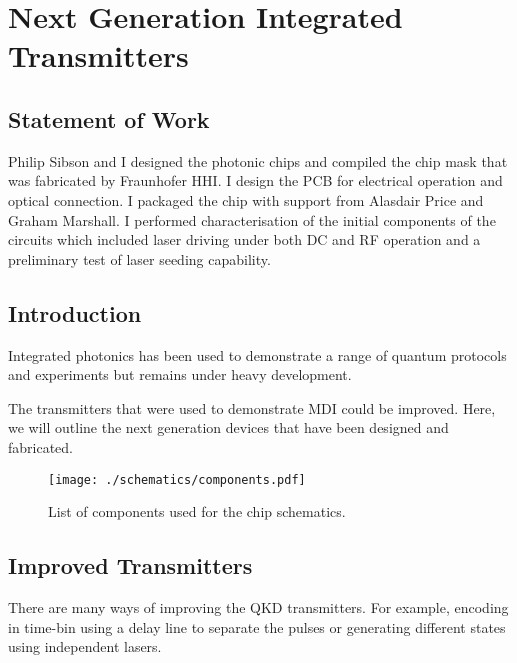 %
%
\graphicspath{{./chapters/chapter06/fig06/}}

\let\textcircled=\pgftextcircled
\chapter{Next Generation Integrated Transmitters}
\label{chap:future}

\section*{Statement of Work}

Philip Sibson and I designed the photonic chips and compiled the chip mask that was fabricated by Fraunhofer HHI. I design the PCB for electrical operation and optical connection. I packaged the chip with support from Alasdair Price and Graham Marshall. I performed characterisation of the initial components of the circuits which included laser driving under both DC and RF operation and a preliminary test of laser seeding capability.

\section{Introduction}

Integrated photonics has been used to demonstrate a range of quantum protocols and experiments \cite{wang2019integrated} but remains under heavy development. 

The transmitters that were used to demonstrate \ac{MDI} could be improved. Here, we will outline the next generation devices that have been designed and fabricated. 

\begin{figure}
	\centering
	\texttt{[image: ./schematics/components.pdf]}
	\caption[Components used for chip schematics]{List of components used for the chip schematics.}
	\label{fig:components}
\end{figure}

\section{Improved Transmitters}

There are many ways of improving the \ac{QKD} transmitters. For example, encoding in time-bin using a delay line to separate the pulses or generating different states using independent lasers.

